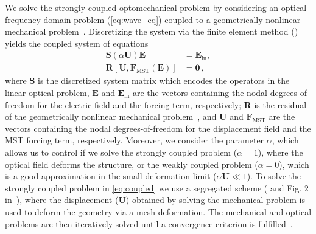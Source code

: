 We solve the strongly coupled optomechanical problem by considering an optical frequency-domain problem (\eqref{eq:wave_eq}) coupled to a geometrically nonlinear mechanical problem~\cite{ownpub5,cook_concepts_2001}. Discretizing the system via the finite element
method () yields the coupled system of equations
\begin{equation}\label{eq:coupled}
    \begin{aligned}
 \mathbf{S}\left(\alpha\mathbf{U}\right) \mathbf{E} &= \mathbf{E}_\text{in} , \\
 \mathbf{R}[\mathbf{U}, \mathbf{F}_\text{MST}(\mathbf{E})] &=\mathbf{0}\,,
    \end{aligned}
    \end{equation}
where $\mathbf{S}$ is the discretized system matrix which encodes the operators
 in the linear optical problem, $\mathbf{E}$ and 
 $\mathbf{E}_\text{in}$ are the vectors containing the nodal degrees-of-freedom for the electric 
field and the forcing term, respectively; $\mathbf{R}$ is the residual of the
 geometrically nonlinear mechanical problem~\cite{cook_concepts_2001}, and 
 $\mathbf{U}$ and $\mathbf{F}_\text{MST}$ are the vectors containing the nodal
 degrees-of-freedom for the displacement field and the MST forcing term, respectively. 
 Moreover, we consider the parameter $\alpha$, which allows us to control if we solve 
 the strongly coupled problem ($\alpha=1$), where the optical field deforms the structure, 
 or the weakly coupled problem ($\alpha=0$), which is a good approximation in the small deformation 
 limit ($\alpha\mathbf{U} \ll 1$). To solve the strongly coupled problem in 
  \eqref{eq:coupled} we use a segregated scheme ( and Fig. 2 in~\cite{ownpub5}), where the displacement ($\mathbf{U}$) obtained
 by solving the mechanical problem is used to deform the geometry via a mesh deformation. The mechanical and
 optical problems are then iteratively solved until a convergence criterion is fulfilled~\cite {ownpub5}.

